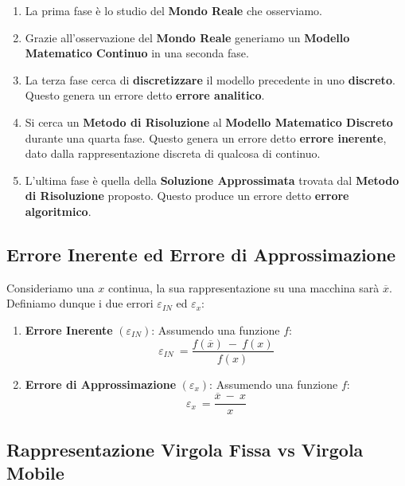 \documentclass{article}
\begin{document}
\begin{enumerate}
    \item La prima fase è lo studio del \textbf{Mondo Reale} che osserviamo.
    \item Grazie all'osservazione del \textbf{Mondo Reale} generiamo un \textbf{Modello Matematico Continuo} in una seconda fase.
    \item La terza fase cerca di \textbf{discretizzare} il modello precedente in uno \textbf{discreto}. Questo genera un errore detto \textbf{errore analitico}.
    \item Si cerca un \textbf{Metodo di Risoluzione} al \textbf{Modello Matematico Discreto} durante una quarta fase. Questo genera un errore detto \textbf{errore inerente}, dato dalla rappresentazione discreta di qualcosa di continuo.
    \item L'ultima fase è quella della \textbf{Soluzione Approssimata} trovata dal 
    \newline \textbf{Metodo di Risoluzione} proposto. Questo produce un errore detto \textbf{errore algoritmico}.
\end{enumerate}

\vspace*{15px}

\subsection{Errore Inerente ed Errore di Approssimazione}

Consideriamo una $x$ continua, la sua rappresentazione su una macchina sarà $\overline{x}$. Definiamo dunque i due errori $\varepsilon_{IN}$ ed $\varepsilon_{x}$:

\vspace*{8px}

\begin{enumerate}
    \item \textbf{Errore Inerente} $(\varepsilon_{IN})$: Assumendo una funzione $f$:
    \[ \varepsilon_{IN} \: = \frac{f(\overline{x}) \: - \: f(x)}{f(x)} \]

\vspace*{8px}

    \item \textbf{Errore di Approssimazione} $(\varepsilon_{x})$: Assumendo una funzione $f$:
    \[ \varepsilon_{x} \: = \frac{\overline{x} \: - \: x}{x} \]
\end{enumerate}

\newpage

\subsection{Rappresentazione Virgola Fissa vs Virgola Mobile}
\end{document}
